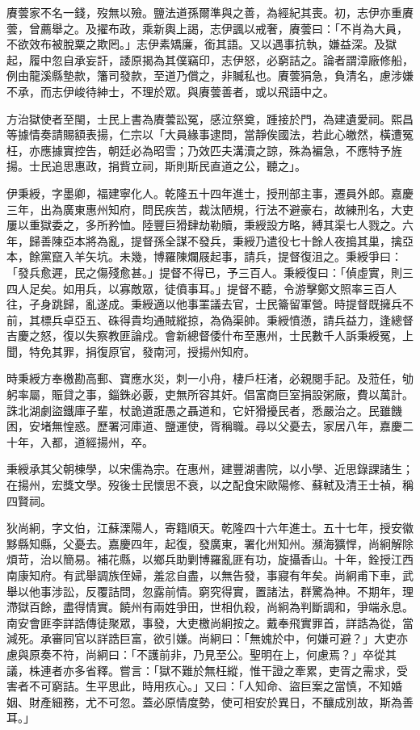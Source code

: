 \begin{pinyinscope}
賡蕓家不名一錢，歿無以殮。鹽法道孫爾準與之善，為經紀其喪。初，志伊亦重賡蕓，曾薦舉之。及擢布政，乘新輿上謁，志伊諷以戒奢，賡蕓曰：「不肖為大員，不欲效布被脫粟之欺罔。」志伊素矯廉，銜其語。又以遇事抗執，嫌益深。及獄起，履中忽自承妄訐，諉原揭為其僕竊印，志伊怒，必窮詰之。論者謂漳廠修船，例由龍溪縣墊款，籓司發款，至道乃償之，非贓私也。賡蕓狷急，負清名，慮涉嫌不承，而志伊峻待紳士，不理於眾。與賡蕓善者，或以飛語中之。

方治獄使者至閩，士民上書為賡蕓訟冤，感泣祭奠，踵接於門，為建遺愛祠。熙昌等據情奏請賜額表揚，仁宗以「大員緣事逮問，當靜俟國法，若此心皦然，橫遭冤枉，亦應據實控告，朝廷必為昭雪；乃效匹夫溝瀆之諒，殊為褊急，不應特予旌揚。士民追思惠政，捐貲立祠，斯則斯民直道之公，聽之」。

伊秉綬，字墨卿，福建寧化人。乾隆五十四年進士，授刑部主事，遷員外郎。嘉慶三年，出為廣東惠州知府，問民疾苦，裁汰陋規，行法不避豪右，故練刑名，大吏屢以重獄委之，多所矜恤。陸豐巨猾肆劫勒贖，秉綬設方略，縛其渠七人戮之。六年，歸善陳亞本將為亂，提督孫全謀不發兵，秉綬乃遣役七十餘人夜搗其巢，擒亞本，餘黨竄入羊矢坑。未幾，博羅陳爛屐起事，請兵，提督復沮之。秉綬爭曰：「發兵愈遲，民之傷殘愈甚。」提督不得已，予三百人。秉綬復曰：「偵虛實，則三四人足矣。如用兵，以寡敵眾，徒僨事耳。」提督不聽，令游擊鄭文照率三百人往，孑身跳歸，亂遂成。秉綬適以他事罣議去官，士民籥留軍營。時提督既擁兵不前，其標兵卓亞五、硃得貴均通賊縱掠，為偽渠帥。秉綬憤懣，請兵益力，逢總督吉慶之怒，復以失察教匪論戍。會新總督倭什布至惠州，士民數千人訴秉綬冤，上聞，特免其罪，捐復原官，發南河，授揚州知府。

時秉綬方奉檄勘高郵、寶應水災，刺一小舟，棲戶枉渚，必親閱手記。及蒞任，劬躬率屬，賑貸之事，錙銖必覈，吏無所容其奸。倡富商巨室捐設粥廠，費以萬計。誅北湖劇盜鐵庫子輩，杖詭道誑愚之聶道和，它奸猾擾民者，悉嚴治之。民雖饑困，安堵無惶惑。歷署河庫道、鹽運使，胥稱職。尋以父憂去，家居八年，嘉慶二十年，入都，道經揚州，卒。

秉綬承其父朝棟學，以宋儒為宗。在惠州，建豐湖書院，以小學、近思錄課諸生；在揚州，宏獎文學。歿後士民懷思不衰，以之配食宋歐陽修、蘇軾及清王士禎，稱四賢祠。

狄尚絅，字文伯，江蘇溧陽人，寄籍順天。乾隆四十六年進士。五十七年，授安徽黟縣知縣，父憂去。嘉慶四年，起復，發廣東，署化州知州。瀕海獷悍，尚絅解除煩苛，治以簡易。補花縣，以鄉兵助剿博羅亂匪有功，旋攝香山。十年，銓授江西南康知府。有武舉調族侄婦，羞忿自盡，以無告發，事寢有年矣。尚絅甫下車，武舉以他事涉訟，反覆詰問，忽露前情。窮究得實，置諸法，群驚為神。不期年，理滯獄百餘，盡得情實。饒州有兩姓爭田，世相仇殺，尚絅為判斷調和，爭端永息。南安會匪李詳誥傳徒聚眾，事發，大吏檄尚絅按之。戴奉飛實罪首，詳誥為從，當減死。承審同官以詳誥巨富，欲引嫌。尚絅曰：「無媿於中，何嫌可避？」大吏亦慮與原奏不符，尚絅曰：「不護前非，乃見至公。聖明在上，何慮焉？」卒從其議，株連者亦多省釋。嘗言：「獄不難於無枉縱，惟干證之牽累，吏胥之需求，受害者不可窮詰。生平思此，時用疚心。」又曰：「人知命、盜巨案之當慎，不知婚姻、財產細務，尤不可忽。蓋必原情度勢，使可相安於異日，不釀成別故，斯為善耳。」


\end{pinyinscope}
